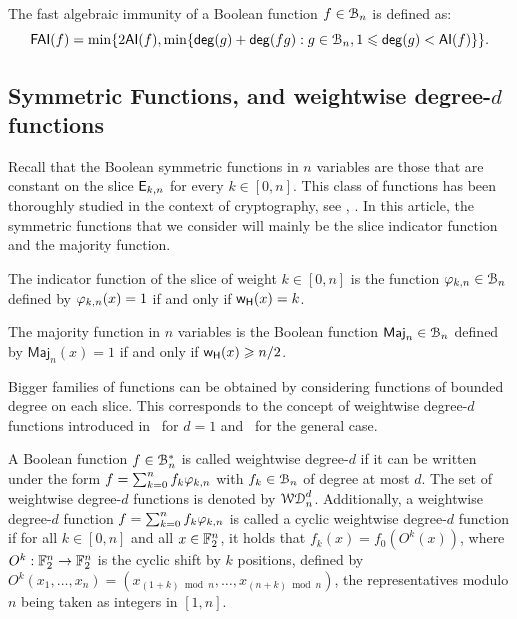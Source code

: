 \documentclass[11pt]{llncs}
\begin{document}
\begin{definition}\label{def:FAI}
	The fast algebraic immunity of a Boolean function $f\in \mathcal{B}_{n}$ is defined as:
	\[
		\mathsf{FAI}(f)=\min \{ 2 \mathsf{AI}(f), \min\{\mathsf{deg}(g)+ \mathsf{deg}(fg):g\in\mathcal{B}_n,1\leqslant\mathsf{deg}(g)<\mathsf{AI}(f)\}\}.
	\]
\end{definition}

\subsection{Symmetric Functions, \hwbf{} and weightwise degree-$d$ functions}

Recall that the Boolean symmetric functions in $n$ variables are those that are constant on the slice $\mathsf{E}_{k,n}$ for every $k\in [0,n]$. 
This class of functions has been thoroughly studied in the context of cryptography, see \eg, \cite{IEEE:Carlet04,IEEE:CanVid05,INDO:BraPre05,DM:SarMai07,IEEE:QFLW09,IEEE:CheLu11,Latin:Meaux19,CCDS:Meaux21,IEEE:CarMea21}.
In this article, the symmetric functions that we consider will mainly be the slice indicator function and the majority function.

\begin{definition}\label{def:slice}
	The indicator function of the slice of weight $k\in[0,n]$ is the function $\varphi_{k,n}\in\mathcal{B}_n$ defined by $\varphi_{k,n}(x)=1$ if and only if $\mathsf{w_H}(x)=k$.
\end{definition}

\begin{definition}\label{def:maj}
    The majority function in $n$ variables is the Boolean function $\mathsf{Maj}_n\in\mathcal{B}_n$ defined by $\mathsf{Maj}_n(x)=1$ if and only if $\mathsf{w_H}(x)\geqslant n/2$.
\end{definition}

Bigger families of functions can be obtained by considering functions of bounded degree on each slice. This corresponds to the concept of weightwise degree-$d$ functions introduced in~\cite{DAM:GinMea22} for $d=1$ and~\cite{DAM:MeaOza24} for the general case. 

\begin{definition}\label{def:wwdegd}
    A Boolean function $f\in\mathcal{B}_n^*$ is called weightwise degree-$d$ if it can be written under the form $f=\sum_{k=0}^n f_k \varphi_{k,n}$ with $f_k\in\mathcal{B}_n$ of degree at most $d$. The set of weightwise degree-$d$ functions is denoted by $\mathcal{WD}^{d}_{n}$.
	Additionally, a weightwise degree-$d$ function $f=\sum_{k=0}^n f_k \varphi_{k,n}$ is called a cyclic weightwise degree-$d$ function if for all $k\in [0,n]$ and all $x\in\mathbb{F}_2^n$, it holds that $f_k(x)=f_0(O^k(x))$, where $O^k:\mathbb{F}_2^n\to\mathbb{F}_2^n$ is the cyclic shift by $k$ positions, defined by $O^k(x_1,\dots,x_n)=(x_{(1+k)\bmod n},\dots,x_{(n+k)\bmod n})$, the representatives modulo $n$ being taken as integers in $[1,n]$.
\end{definition}
\end{document}
